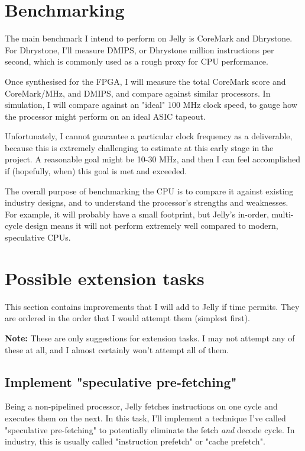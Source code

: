 \documentclass{article}
\begin{document}
\section{Benchmarking}
The main benchmark I intend to perform on Jelly is CoreMark and Dhrystone. For Dhrystone, I'll measure DMIPS,
or Dhrystone million instructions per second, which is commonly used as a rough proxy for CPU performance.

Once synthesised for the FPGA, I will measure the total CoreMark score and CoreMark/MHz, and DMIPS, and
compare against similar processors. In simulation, I will compare against an "ideal" 100 MHz clock speed, to
gauge how the processor might perform on an ideal ASIC tapeout.


Unfortunately, I cannot guarantee a particular clock frequency as a deliverable, because this is extremely
challenging to estimate at this early stage in the project. A reasonable goal might be 10-30 MHz, and then
I can feel accomplished if (hopefully, when) this goal is met and exceeded.

The overall purpose of benchmarking the CPU is to compare it against existing industry designs, and to 
understand the processor's strengths and weaknesses. For example, it will probably have a small footprint,
but Jelly's in-order, multi-cycle design means it will not perform extremely well compared to modern, speculative
CPUs.

\section{Possible extension tasks}
This section contains improvements that I will add to Jelly if time permits. They are ordered in the order
that I would attempt them (simplest first).

\textbf{Note:} These are only suggestions for extension tasks. I may not attempt any of these at all, and I
almost certainly won't attempt all of them.

\subsection{Implement "speculative pre-fetching"}
Being a non-pipelined processor, Jelly fetches instructions on one cycle and executes them on the next. In
this task, I'll implement a technique I've called "speculative pre-fetching" to potentially eliminate the
fetch \textit{and} decode cycle. In industry, this is usually called "instruction prefetch" or "cache
prefetch".
\end{document}
